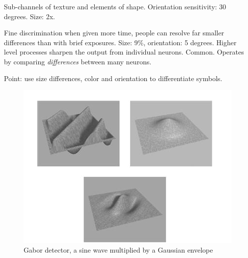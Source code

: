 \begin{mdframed}
\begin{multicols}{2}
\begin{compactdesc}
        Sub-channels of texture and elements of shape. Orientation sensitivity:
        30 degrees. Size: 2x.
    \item[Fine discrimination] when given more time, people can resolve far
        smaller differences than with brief exposures. Size: 9\%, orientation:
        5 degrees.
        Higher level processes sharpen the output from individual neurons.
        Common. Operates by comparing \emph{differences} between many neurons.
    \item[Point:] use size differences, color and orientation to differentiate
        symbols.
\end{compactdesc}
    \begin{figure}[H]
        \centering
        \includegraphics[width=0.5\linewidth]{gabor.png}
        \caption{Gabor detector, a sine wave multiplied by a Gaussian envelope}
    \end{figure}

\end{multicols}
\end{mdframed}



